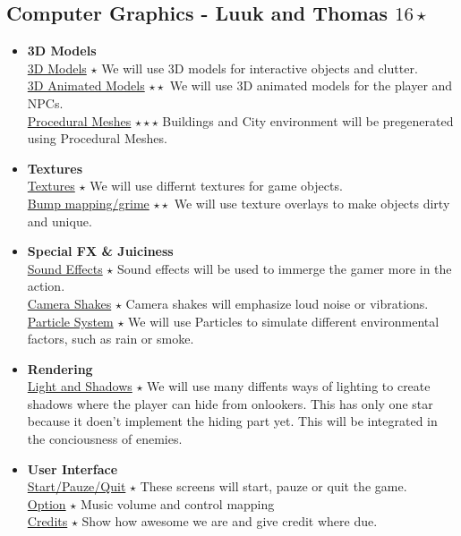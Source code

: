 \documentclass{article}
\begin{document}
		\subsection{Computer Graphics - Luuk and Thomas $16 \star$}
			\begin{itemize}
				\item \textbf{3D Models}\\
					\underline{3D Models} $\star$ We will use 3D models for interactive objects and clutter.\\
					\underline{3D Animated Models} $\star \star$  We will use 3D animated models for the player and NPCs.\\
					\underline{Procedural Meshes} $\star \star \star$  Buildings and City environment will be pregenerated using Procedural Meshes.
				\item \textbf{Textures}\\
					\underline{Textures} $\star$ We will use differnt textures for game objects.\\
					\underline{Bump mapping/grime} $\star \star$ We will use texture overlays to make objects dirty and unique.
				\item \textbf{Special FX \& Juiciness}\\
					\underline{Sound Effects} $\star$ Sound effects will be used to immerge the gamer more in the action.\\
					\underline{Camera Shakes} $\star$ Camera shakes will emphasize loud noise or vibrations.\\
					\underline{Particle System} $\star$ We will use Particles to simulate different environmental factors, such as rain or smoke.
				\item \textbf{Rendering}\\
					\underline{Light and Shadows} $\star$  We will use many diffents ways of lighting to create shadows where the player can hide from onlookers. This has only one star because it doen't implement the hiding part yet. This will be integrated in the conciousness of enemies.
				\item \textbf{User Interface}\\
					\underline{Start/Pauze/Quit} $\star$ These screens will start, pauze or quit the game.\\
					\underline{Option} $\star$ Music volume and control mapping\\
					\underline{Credits} $\star$ Show how awesome we are and give credit where due.
			\end{itemize}
\end{document}
